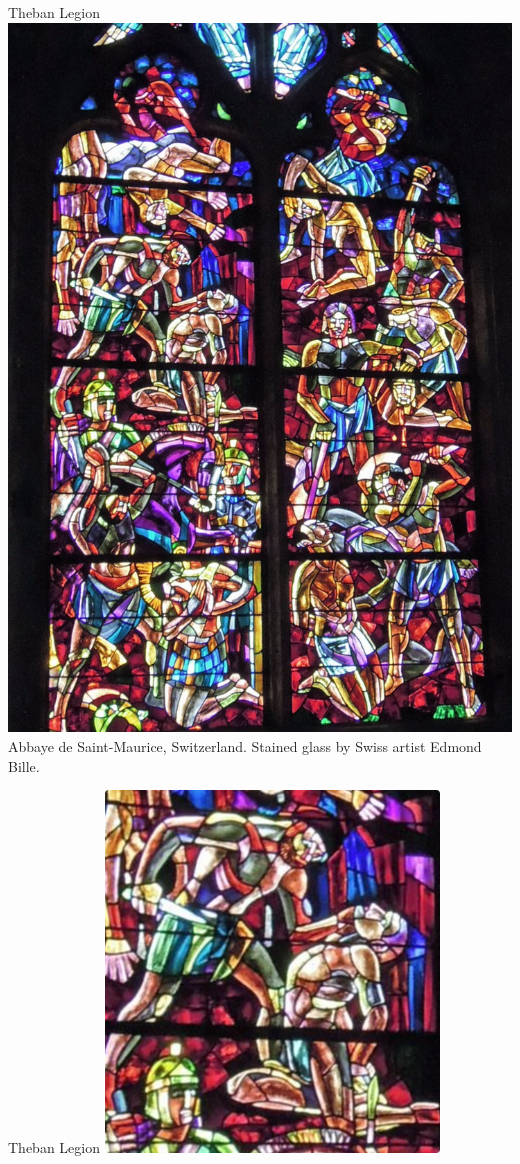 \begin{frame}{Theban Legion}
    \centering
    \includegraphics[height=0.7\textheight]{img/theban-1.jpg} \\
    Abbaye de Saint-Maurice, Switzerland. Stained glass by Swiss artist Edmond Bille. \\
\end{frame}

\begin{frame}{Theban Legion}
    \centering
    \includegraphics[height=0.7\textheight]{img/theban-sample1.png} \\
\end{frame}

